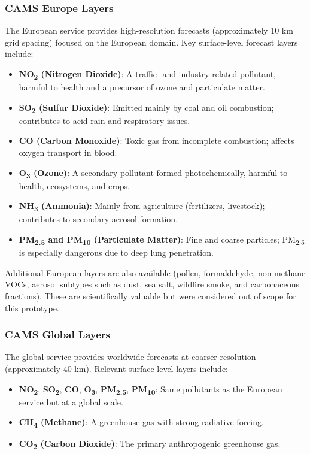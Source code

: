\subsubsection{CAMS Europe Layers}
The European service provides high-resolution forecasts (approximately 10 km grid spacing) focused on the European domain.  
Key surface-level forecast layers include:
\begin{itemize}
	\item \textbf{NO\textsubscript{2} (Nitrogen Dioxide)}: A traffic- and industry-related pollutant, harmful to health and a precursor of ozone and particulate matter.
	\item \textbf{SO\textsubscript{2} (Sulfur Dioxide)}: Emitted mainly by coal and oil combustion; contributes to acid rain and respiratory issues.
	\item \textbf{CO (Carbon Monoxide)}: Toxic gas from incomplete combustion; affects oxygen transport in blood.
	\item \textbf{O\textsubscript{3} (Ozone)}: A secondary pollutant formed photochemically, harmful to health, ecosystems, and crops.
	\item \textbf{NH\textsubscript{3} (Ammonia)}: Mainly from agriculture (fertilizers, livestock); contributes to secondary aerosol formation.
	\item \textbf{PM\textsubscript{2.5} and PM\textsubscript{10} (Particulate Matter)}: Fine and coarse particles; PM\textsubscript{2.5} is especially dangerous due to deep lung penetration.
\end{itemize}

Additional European layers are also available (pollen, formaldehyde, non-methane VOCs, aerosol subtypes such as dust, sea salt, wildfire smoke, and carbonaceous fractions).  
These are scientifically valuable but were considered out of scope for this prototype.

\subsubsection{CAMS Global Layers}
The global service provides worldwide forecasts at coarser resolution (approximately 40 km).  
Relevant surface-level layers include:
\begin{itemize}
	\item \textbf{NO\textsubscript{2}}, \textbf{SO\textsubscript{2}}, \textbf{CO}, \textbf{O\textsubscript{3}}, \textbf{PM\textsubscript{2.5}}, \textbf{PM\textsubscript{10}}: Same pollutants as the European service but at a global scale.
	\item \textbf{CH\textsubscript{4} (Methane)}: A greenhouse gas with strong radiative forcing.
	\item \textbf{CO\textsubscript{2} (Carbon Dioxide)}: The primary anthropogenic greenhouse gas.
\end{itemize}

